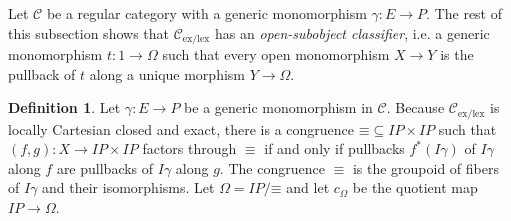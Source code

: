 \documentclass[sort&compress]{elsarticle}
\theoremstyle{plain}
\theoremstyle{definition}
\newtheorem{defin}[theorem]{Definition}
\theoremstyle{remark}
\newcommand\hide[1]{}
\newcommand\cat\mathcal
\newcommand\exlex{_\mathrm{ex/lex}}\newcommand\exreg{_\mathrm{ex/reg}}
\begin{document}
\newcommand\exeq{\equiv}
\hide{%
\newcommand\cl{\mathcal O}
\begin{defin} For each object $X$ of $\cat C\exlex$ a \emph{open subobject} is an isomorphism class of open monomorphisms to $X$. Let $\cl(X)$ be the \emph{set} of open subobjects. Note that $\cl$ is a functor $\cat C\exlex\dual \to \Set$, because open monomorphisms are stable under pullback. \end{defin}

Let $\cat C$ be a regular category with a generic monomorphism $\gamma:E\to P$. I show next that $\cat C\exlex$ has an object $\Omega$ that represents $\cl$: the .
\begin{defin} Let $\gamma:E\to P$ be a generic monomorphism in $\cat C$. Because $\cat C\exlex$ is locally Cartesian closed, the inverse image maps $f\inv:\sub(Y)\to \sub(x)$ of each $f:X\to Y$ in $\cat C\exlex$ has a right adjoint $\forall_f$ which satisfies the Beck-Chevalley condition. Thank to these right adjoints, the following congruence on $IP$ exists in $\cat C\exlex$.
\[ (p\exeq q) \iff (p\in \db{I\gamma} \leftrightarrow q\in \db{I\gamma}) \]
Here $\db{I\gamma}$ is the subobject containing all monics isomorphic to $I\gamma$. Let $\Omega = IP/\mathord\exeq$ and let $c_\Omega$ be the quotient map $IP \to \Omega$.
\end{defin}
}


Let $\cat C$ be a regular category with a generic monomorphism $\gamma:E\to P$. The rest of this subsection shows that $\cat C\exlex$ has an \emph{open-subobject classifier}, i.e. a generic monomorphism $t:1\to\Omega$ such that every open monomorphism $X\to Y$ is the pullback of $t$ along a unique morphism $Y\to \Omega$.

\begin{defin} Let $\gamma:E\to P$ be a generic monomorphism in $\cat C$. Because $\cat C\exlex$ is locally Cartesian closed and exact, there is a congruence $\mathord\exeq\subseteq IP\times IP$ such that $(f,g):X\to IP\times IP$ factors through $\exeq$ if and only if pullbacks $f^*(I\gamma)$ of $I\gamma$ along $f$ are pullbacks of $I\gamma$ along $g$. The congruence $\exeq$ is the groupoid of fibers of $I\gamma$ and their isomorphisms. Let $\Omega = IP/\mathord\exeq$ and let $c_\Omega$ be the quotient map $IP \to \Omega$.
\end{defin}
\end{document}
